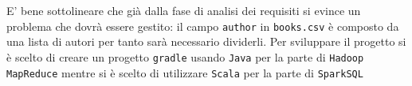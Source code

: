 \documentclass[11pt]{article}
\begin{document}
E' bene sottolineare che già dalla fase di analisi dei requisiti si evince un problema che dovrà essere gestito: il campo
\texttt{author} in \texttt{books.csv} è composto da una lista di autori per tanto sarà necessario dividerli.
Per sviluppare il progetto si è scelto di creare un progetto \texttt{gradle} usando \texttt{Java} per la parte di
\texttt{Hadoop MapReduce} mentre si è scelto di utilizzare \texttt{Scala} per la parte di \texttt{SparkSQL}

\newpage


\newpage

\end{document}
